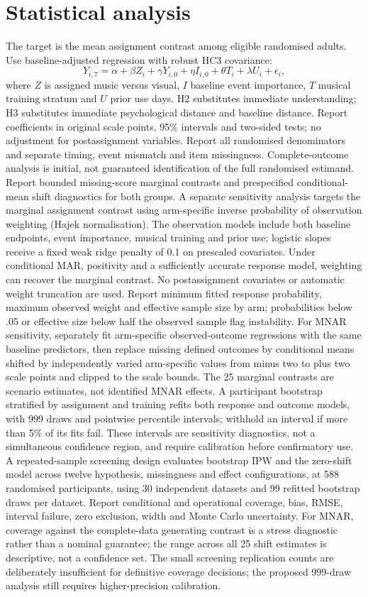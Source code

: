\documentclass[11pt,a4paper]{article}
\begin{document}
\section{Statistical analysis}
The target is the mean assignment contrast among eligible randomised adults. Use baseline-adjusted regression with robust HC3 covariance:
\[
Y_{i,7}=\alpha+\beta Z_i+\gamma Y_{i,0}+\eta I_{i,0}+\theta T_i+\lambda U_i+\epsilon_i,
\]
where $Z$ is assigned music versus visual, $I$ baseline event importance, $T$ musical training stratum and $U$ prior use days. H2 substitutes immediate understanding; H3 substitutes immediate psychological distance and baseline distance. Report coefficients in original scale points, 95\% intervals and two-sided tests; no adjustment for postassignment variables. Report all randomised denominators and separate timing, event mismatch and item missingness. Complete-outcome analysis is initial, not guaranteed identification of the full randomised estimand. Report bounded missing-score marginal contrasts and prespecified conditional-mean shift diagnostics for both groups. A separate sensitivity analysis targets the marginal assignment contrast using arm-specific inverse probability of observation weighting (Hajek normalisation). The observation models include both baseline endpoints, event importance, musical training and prior use; logistic slopes receive a fixed weak ridge penalty of 0.1 on prescaled covariates. Under conditional MAR, positivity and a sufficiently accurate response model, weighting can recover the marginal contrast. No postassignment covariates or automatic weight truncation are used. Report minimum fitted response probability, maximum observed weight and effective sample size by arm; probabilities below .05 or effective size below half the observed sample flag instability. For MNAR sensitivity, separately fit arm-specific observed-outcome regressions with the same baseline predictors, then replace missing defined outcomes by conditional means shifted by independently varied arm-specific values from minus two to plus two scale points and clipped to the scale bounds. The 25 marginal contrasts are scenario estimates, not identified MNAR effects. A participant bootstrap stratified by assignment and training refits both response and outcome models, with 999 draws and pointwise percentile intervals; withhold an interval if more than 5\% of its fits fail. These intervals are sensitivity diagnostics, not a simultaneous confidence region, and require calibration before confirmatory use. A repeated-sample screening design evaluates bootstrap IPW and the zero-shift model across twelve hypothesis, missingness and effect configurations, at 588 randomised participants, using 30 independent datasets and 99 refitted bootstrap draws per dataset. Report conditional and operational coverage, bias, RMSE, interval failure, zero exclusion, width and Monte Carlo uncertainty. For MNAR, coverage against the complete-data generating contrast is a stress diagnostic rather than a nominal guarantee; the range across all 25 shift estimates is descriptive, not a confidence set. The small screening replication counts are deliberately insufficient for definitive coverage decisions; the proposed 999-draw analysis still requires higher-precision calibration.
\end{document}
